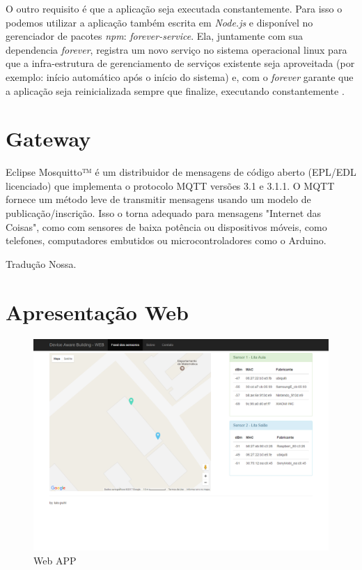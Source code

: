 O outro requisito é que a aplicação seja executada constantemente. Para isso o
podemos utilizar a aplicação também escrita em \emph{Node.js} e disponível no
gerenciador de pacotes \emph{npm}: \emph{forever-service}. Ela, juntamente com
sua dependencia \emph{forever}, registra um novo serviço no sistema operacional
linux para que a infra-estrutura de gerenciamento de serviços  existente seja
aproveitada (por exemplo: início automático após o início do sistema) e, com o
\emph{forever} garante que a aplicação seja reinicializada sempre que finalize,
executando constantemente \cite{forever-service}.


\section{Gateway}
\label{sec:app-gw}

\begin{citacao}

	Eclipse Mosquitto™ é um distribuidor de mensagens de código aberto (EPL/EDL
	licenciado) que implementa o protocolo MQTT versões 3.1 e 3.1.1. O MQTT
	fornece um método leve de transmitir mensagens usando um modelo de
	publicação/inscrição. Isso o torna adequado para mensagens "Internet das
	Coisas", como com sensores de baixa potência ou dispositivos móveis, como
	telefones, computadores embutidos ou microcontroladores como o Arduino. \

	 Tradução Nossa.
\end{citacao}


\section{Apresentação Web}
\label{sec:app-web}


\begin{figure}[htb]
	\caption{\label{fig-web-app}Web APP}
	\begin{center}
		\includegraphics[width=1\textwidth]{050-construcao/web-app.png}
	\end{center}
\end{figure}
